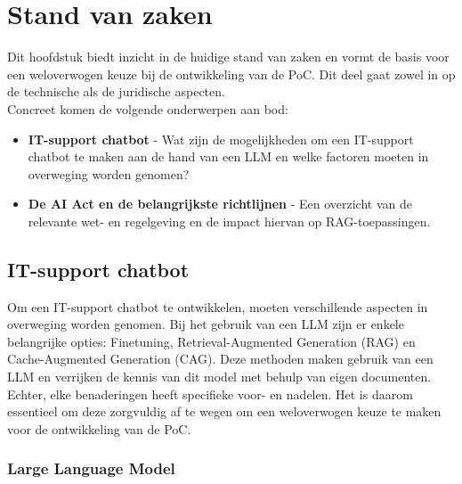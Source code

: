 \chapter{Stand van zaken}
\label{ch:stand-van-zaken}


Dit hoofdstuk biedt inzicht in de huidige stand van zaken en vormt de basis voor een weloverwogen keuze bij de ontwikkeling van de PoC. Dit deel gaat zowel in op de technische als de juridische aspecten.
\\[1em]
Concreet komen de volgende onderwerpen aan bod:
\begin{itemize}
    \item \textbf{IT-support chatbot} - Wat zijn de mogelijkheden om een IT-support chatbot te maken aan de hand van een LLM en welke factoren moeten in overweging worden genomen?
    \item \textbf{De AI Act en de belangrijkste richtlijnen} - Een overzicht van de relevante wet- en regelgeving en de impact hiervan op RAG-toepassingen.
\end{itemize}

\section{IT-support chatbot}

Om een IT-support chatbot te ontwikkelen, moeten verschillende aspecten in overweging worden genomen. Bij het gebruik van een LLM zijn er enkele belangrijke opties: Finetuning, Retrieval-Augmented Generation (RAG) en Cache-Augmented Generation (CAG). Deze methoden maken gebruik van een LLM en verrijken de kennis van dit model met behulp van eigen documenten. Echter, elke benaderingen heeft specifieke voor- en nadelen. Het is daarom essentieel om deze zorgvuldig af te wegen om een weloverwogen keuze te maken voor de ontwikkeling van de PoC.

\subsection{Large Language Model}
    
